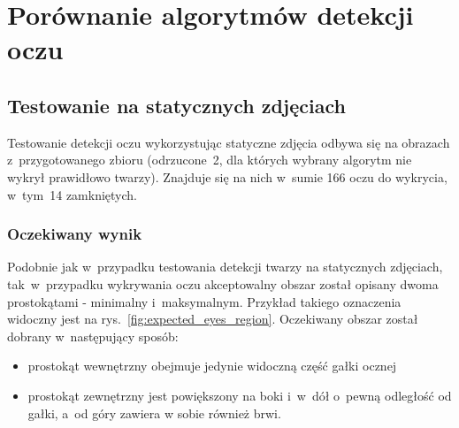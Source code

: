 \newpage

\section{Porównanie algorytmów detekcji oczu}



\subsection{Testowanie na statycznych zdjęciach}

Testowanie detekcji oczu wykorzystując statyczne zdjęcia odbywa się na obrazach z~przygotowanego zbioru (odrzucone~2, dla których wybrany algorytm nie wykrył prawidłowo twarzy). Znajduje się na nich w~sumie 166 oczu do wykrycia, w~tym~14 zamkniętych.

\subsubsection{Oczekiwany wynik}

Podobnie jak w~przypadku testowania detekcji twarzy na statycznych zdjęciach, tak~w~przypadku wykrywania oczu akceptowalny obszar został opisany dwoma prostokątami - minimalny i~maksymalnym. Przykład takiego oznaczenia widoczny jest na rys.~\ref{fig:expected_eyes_region}. Oczekiwany obszar został dobrany w~następujący sposób:

\begin{itemize}
    \item prostokąt wewnętrzny obejmuje jedynie widoczną część gałki ocznej
    \item prostokąt zewnętrzny jest powiększony na boki i~w~dół o~pewną odległość od gałki, a~od góry zawiera w sobie również brwi.
\end{itemize}

